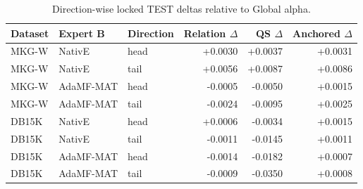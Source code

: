 \begin{table}[t]
\centering
\small
\caption{Direction-wise locked TEST deltas relative to Global alpha.}
\label{tab:supp_anchored_dynamic_by_direction}
\setlength{\tabcolsep}{4pt}
\begin{tabular}{lllrrr}
\toprule
Dataset & Expert B & Direction & Relation $\Delta$ & QS $\Delta$ & Anchored $\Delta$ \\
\midrule
MKG-W & NativE & head & +0.0030 & +0.0037 & +0.0031 \\
MKG-W & NativE & tail & +0.0056 & +0.0087 & +0.0086 \\
MKG-W & AdaMF-MAT & head & -0.0005 & -0.0050 & +0.0015 \\
MKG-W & AdaMF-MAT & tail & -0.0024 & -0.0095 & +0.0025 \\
DB15K & NativE & head & +0.0006 & -0.0034 & +0.0015 \\
DB15K & NativE & tail & -0.0011 & -0.0145 & +0.0011 \\
DB15K & AdaMF-MAT & head & -0.0014 & -0.0182 & +0.0007 \\
DB15K & AdaMF-MAT & tail & -0.0009 & -0.0350 & +0.0008 \\
\bottomrule
\end{tabular}
\end{table}
